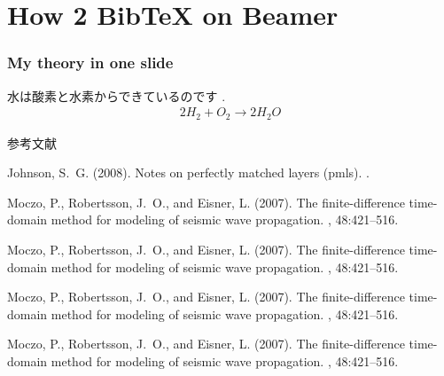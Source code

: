\documentclass[dvipdfmx,cjk]{beamer}
\begin{document}
\section{How 2 BibTeX on Beamer}
\begin{frame} \frametitle{My theory in one slide}
水は酸素と水素からできているのです \cite{moczo2007finite}.
  \begin{eqnarray}
    2H_2 + O_2 \to 2H_2O
  \end{eqnarray}
\end{frame}

\begin{frame}[allowframebreaks]{参考文献}{}
  
\begin{thebibliography}{}

Johnson, S.~G. (2008).
\newblock Notes on perfectly matched layers (pmls).
.

Moczo, P., Robertsson, J.~O., and Eisner, L. (2007).
\newblock The finite-difference time-domain method for modeling of seismic wave
  propagation.
, 48:421--516.

Moczo, P., Robertsson, J.~O., and Eisner, L. (2007).
\newblock The finite-difference time-domain method for modeling of seismic wave
  propagation.
, 48:421--516.

Moczo, P., Robertsson, J.~O., and Eisner, L. (2007).
\newblock The finite-difference time-domain method for modeling of seismic wave
  propagation.
, 48:421--516.

Moczo, P., Robertsson, J.~O., and Eisner, L. (2007).
\newblock The finite-difference time-domain method for modeling of seismic wave
  propagation.
, 48:421--516.

\end{thebibliography}
\end{frame}
\end{document}
